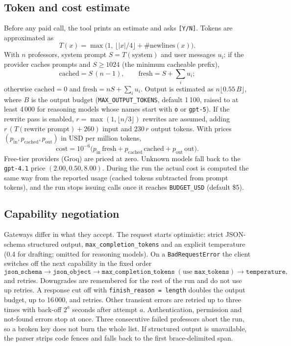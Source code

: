\documentclass[11pt,a4paper]{article}
\newcommand{\code}[1]{\texttt{#1}}
\begin{document}
\subsection{Token and cost estimate}
Before any paid call, the tool prints an estimate and asks \code{[Y/N]}. Tokens are approximated
as
\[
  T(x) = \max\bigl(1,\, \lfloor |x|/4 \rfloor + \#\text{newlines}(x)\bigr) .
\]
With $n$ professors, system prompt $S = T(\text{system})$ and user messages $u_i$: if the
provider caches prompts and $S \ge 1024$ (the minimum cacheable prefix),
\[
  \text{cached} = S\,(n - 1), \qquad \text{fresh} = S + \textstyle\sum_i u_i ;
\]
otherwise $\text{cached} = 0$ and $\text{fresh} = nS + \sum_i u_i$. Output is estimated as
$n \lfloor 0.55\,B \rfloor$, where $B$ is the output budget (\code{MAX\_OUTPUT\_TOKENS}, default
1\,100, raised to at least 4\,000 for reasoning models whose names start with \code{o} or
\code{gpt-5}). If the rewrite pass is enabled, $r = \max(1, \lfloor n/3 \rfloor)$ rewrites are
assumed, adding $r\,(T(\text{rewrite prompt}) + 260)$ input and $230\,r$ output tokens. With
prices $(p_{\text{in}}, p_{\text{cached}}, p_{\text{out}})$ in USD per million tokens,
\[
  \text{cost} = 10^{-6}\bigl(p_{\text{in}}\,\text{fresh} + p_{\text{cached}}\,\text{cached}
  + p_{\text{out}}\,\text{out}\bigr).
\]
Free-tier providers (Groq) are priced at zero. Unknown models fall back to the \code{gpt-4.1}
price $(2.00, 0.50, 8.00)$. During the run the actual cost is computed the same way from the
reported usage (cached tokens subtracted from prompt tokens), and the run stops issuing calls
once it reaches \code{BUDGET\_USD} (default \$5).

\subsection{Capability negotiation}
Gateways differ in what they accept. The request starts optimistic: strict JSON-schema
structured output, \code{max\_completion\_tokens} and an explicit temperature (0.4 for drafting;
omitted for reasoning models). On a \code{BadRequestError} the client switches off the next
capability in the fixed order
\[
  \texttt{json\_schema} \to \texttt{json\_object} \to \texttt{max\_completion\_tokens}
  \;(\text{use } \texttt{max\_tokens}) \to \texttt{temperature},
\]
and retries. Downgrades are remembered for the rest of the run and do not use up retries. A
response cut off with \code{finish\_reason = length} doubles the output budget, up to 16\,000,
and retries. Other transient errors are retried up to three times with back-off $2^{a}$ seconds
after attempt $a$. Authentication, permission and not-found errors stop at once. Three
consecutive failed professors abort the run, so a broken key does not burn the whole list.
If structured output is unavailable, the parser strips code fences and falls back to the first
brace-delimited span.
\end{document}
